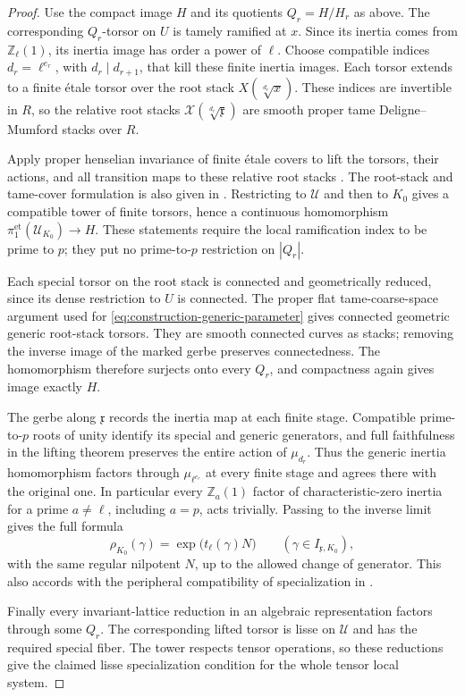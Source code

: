 \begin{proof}
Use the compact image $H$ and its quotients $Q_r=H/H_r$ as above.
The corresponding $Q_r$-torsor on $U$ is tamely ramified at $x$.
Since its inertia comes from $\mathbb Z_\ell(1)$, its inertia image
has order a power of $\ell$.  Choose compatible indices
$d_r=\ell^{e_r}$, with $d_r\mid d_{r+1}$, that kill these finite
inertia images.  Each torsor extends to a finite \'etale torsor over
the root stack $X(\sqrt[d_r]{x})$.  These indices are invertible in
$R$, so the relative root stacks
$\mathscr X(\sqrt[d_r]{\mathfrak x})$ are smooth proper tame
Deligne--Mumford stacks over $R$.

Apply proper henselian invariance of finite \'etale covers to lift
the torsors, their actions, and all transition maps to these relative
root stacks \cite[Theorem~4.5]{Rydh}.  The root-stack and tame-cover
formulation is also given in
\cite[Proposition~A.10, Theorem~A.11, and Corollaries~A.12--A.13]
{LieblichOlsson}.  Restricting to $\mathscr U$ and then to $K_0$
gives a compatible tower of finite torsors, hence a continuous
homomorphism $\pi_1^{\mathrm{et}}(\mathscr U_{K_0})\to H$.
These statements require the local ramification index to be prime
to $p$; they put no prime-to-$p$ restriction on $|Q_r|$.

Each special torsor on the root stack is connected and geometrically
reduced, since its dense restriction to $U$ is connected.  The proper
flat tame-coarse-space argument used for
\eqref{eq:construction-generic-parameter} gives connected geometric
generic root-stack torsors.  They are smooth connected curves as
stacks; removing the inverse image of the marked gerbe preserves
connectedness.  The homomorphism therefore surjects onto every
$Q_r$, and compactness again gives image exactly $H$.

The gerbe along $\mathfrak x$ records the inertia map at each finite
stage.  Compatible prime-to-$p$ roots of unity identify its special
and generic generators, and full faithfulness in the lifting theorem
preserves the entire action of $\mu_{d_r}$.  Thus the generic inertia
homomorphism factors through $\mu_{\ell^{e_r}}$ at every finite stage
and agrees there with the original one.  In particular every
$\mathbb Z_a(1)$ factor of characteristic-zero inertia for a prime
$a\ne\ell$, including $a=p$, acts trivially.  Passing to the inverse
limit gives the full formula
\[
 \rho_{K_0}(\gamma)
   =\exp\bigl(t_\ell(\gamma)N\bigr)
 \qquad(\gamma\in I_{\mathfrak x,K_0}),
\]
with the same regular nilpotent $N$, up to the allowed change of
generator.  This also accords with the peripheral compatibility of
specialization in \cite[Lemma~3.5]{LieblichOlsson}.

Finally every invariant-lattice reduction in an algebraic
representation factors through some $Q_r$.  The corresponding lifted
torsor is lisse on $\mathscr U$ and has the required special fiber.
The tower respects tensor operations, so these reductions give the
claimed lisse specialization condition for the whole tensor local
system.
\end{proof}

